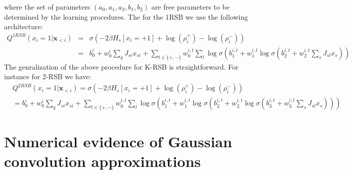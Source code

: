 \documentclass[aps,physrev,10pt,floatfix,longbibliography,nofootinbib,reprint]{revtex4-2}
\begin{document}
where the set of parameters $(a_0, a_1, a_2, b_1, b_2)$ are free parameters to be determined by the learning procedures. The for the 1RSB we use the following architecture:
\begin{eqnarray}
    Q^{1RSB}\left(x_{i}=1|\mathbf{x}_{<i}\right) & = & \sigma\left( 
    -2 \beta H_{s}[x_i = +1] +\log(\rho_i^+) - \log(\rho_i^-)
    \right) \\
    & = & b_0^i + w_0^i\sum_q J_{si} x_{si} + \sum_{t \in \{+,-\}} w_0^{i,t} \sum_l \log\sigma(b_1^{i,t} + w_1^{i,t}\log\sigma(b_2^{i,t} + w_2^{i,t}\sum_{s} J_{sl} x_s))
    \end{eqnarray}
The genralization of the above procedure for K-RSB is straightforward. For instance for 2-RSB we have:
\begin{eqnarray}
    &Q^{2RSB}\left(x_{i}=1|\mathbf{x}_{<i}\right)  =  \sigma\left( 
    -2 \beta H_{s}[x_i = +1] +\log(\rho_i^+) - \log(\rho_i^-)
    \right) \\
    & =  b_0^i + w_0^i\sum_q J_{si} x_{si} + \sum_{t \in \{+,-\}} w_0^{i,t} \sum_l \log\sigma(b_1^{i,t} + w_1^{i,t}\log\sigma(b_2^{i,t} + w_2^{i,t}\log\sigma(b_3^{i,t} + w_3^{i,t}\sum_{s} J_{sl} x_s))) 
    \end{eqnarray}

\section{Numerical evidence of Gaussian convolution approximations}
\end{document}
